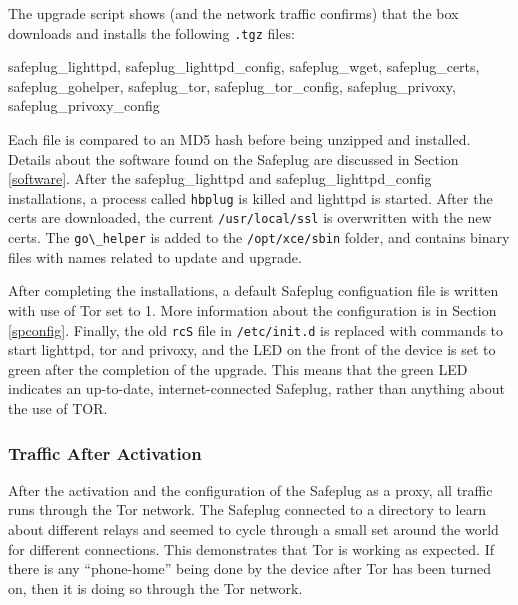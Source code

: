 The upgrade script shows (and the network traffic confirms) that the box downloads and installs the following \verb!.tgz! files: 
\begin{fileName}
safeplug_lighttpd, safeplug_lighttpd_config, safeplug_wget, safeplug_certs, safeplug_gohelper, safeplug_tor, safeplug_tor_config, safeplug_privoxy, safeplug_privoxy_config
\end{fileName}
  Each file is compared to an MD5 hash before being unzipped and installed.  Details about the software found on the Safeplug are discussed in Section \ref{software}.  After the safeplug\_lighttpd and safeplug\_lighttpd\_config installations, a process called \verb!hbplug! is killed and lighttpd is started.  After the certs are downloaded, the current \verb!/usr/local/ssl! is overwritten with the new certs.  The \verb!go\_helper! is added to the \verb!/opt/xce/sbin! folder, and contains binary files with names related to update and upgrade.

After completing the installations, a default Safeplug configuation file is written with use of Tor set to 1.  More information about the configuration is in Section \ref{spconfig}.  Finally, the old \verb!rcS! file in \verb!/etc/init.d! is replaced with commands to start lighttpd, tor and privoxy, and the LED on the front of the device is set to green after the completion of the upgrade. This means that the green LED indicates an up-to-date, internet-connected Safeplug, rather than anything about the use of TOR.

\subsubsection{Traffic After Activation}
After the activation and the configuration of the Safeplug as a proxy, all traffic runs through the Tor network.  The Safeplug connected to a directory to learn about different relays and seemed to cycle through a small set around the world for different connections.  This demonstrates that Tor is working as expected.  If there is any ``phone-home'' being done by the device after Tor has been turned on, then it is doing so through the Tor network.
